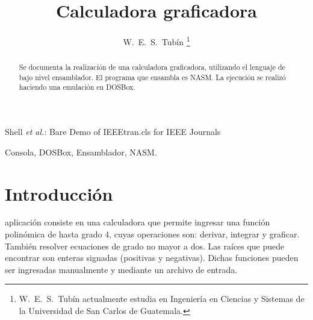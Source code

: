 \documentclass[journal]{../../IEEEtran/IEEEtran}
\begin{document}
\title{Calculadora graficadora}


\author { W.~E.~S.~Tubín \thanks{W.~E.~S.~Tubín actualmente
    estudia en Ingeniería en Ciencias y Sistemas de la Universidad de
    San Carlos de Guatemala. } }


%
{Shell \MakeLowercase{\textit{et al.}}: Bare Demo of IEEEtran.cls for IEEE Journals}

\maketitle

\begin{abstract}
  Se documenta la realización de una calculadora graficadora,
  utilizando el lenguaje de bajo nivel ensamblador. El programa que
  ensambla es NASM. La ejecución se realizó haciendo una emulación en
  DOSBox.
\end{abstract}


\begin{IEEEkeywords}
Consola, DOSBox, Ensamblador, NASM.
\end{IEEEkeywords}



%



\section{Introducción}
% 
% 
% 
% 
 aplicación consiste en una calculadora que permite
ingresar una función polinómica de hasta grado 4, cuyas operaciones
son: derivar, integrar y graficar. También resolver ecuaciones de
grado no mayor a dos. Las raíces que puede encontrar son enteras
signadas (positivas y negativas). Dichas funciones pueden ser
ingresadas manualmente y mediante un archivo de entrada.
\end{document}
